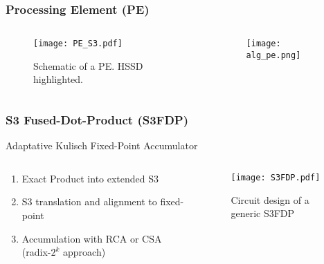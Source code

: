 \begin{frame}
	\frametitle{Processing Element (PE)}

    \begin{columns}
        \begin{column}{0.6\textwidth}
	\begin{figure}[H]
		\centering
		\texttt{[image: PE\_S3.pdf]}
		\vspace{-0.3cm}
		\caption{Schematic of a PE. HSSD highlighted.}
	\end{figure}

        \end{column}

        \begin{column}{0.4\textwidth}
	    \begin{figure}[H]
            \centering
            \texttt{[image: alg\_pe.png]}
            \caption{}
	    \end{figure}
        \end{column}
    \end{columns}

\end{frame}

\begin{frame}
	\frametitle{S3 Fused-Dot-Product (S3FDP)}

    Adaptative Kulisch Fixed-Point Accumulator~\cite{de_dinechin_fpga-specific_2008}
    \begin{columns}
        \begin{column}{0.55\textwidth}
	    \begin{enumerate}
		\item<1-> Exact Product into extended S3
		\item<2-> S3 translation and alignment to fixed-point
		\item<3-> Accumulation with RCA or CSA (radix-$2^{k}$ approach)
	    \end{enumerate}

        \end{column}

        \begin{column}{0.45\textwidth}
	    \begin{figure}[H]
            \centering
	    \vspace{0.2cm}
            \texttt{[image: S3FDP.pdf]}
	    \vspace{-0.3cm}
            \caption{Circuit design of a generic S3FDP}
	    \end{figure}
        \end{column}
    \end{columns}


\end{frame}

